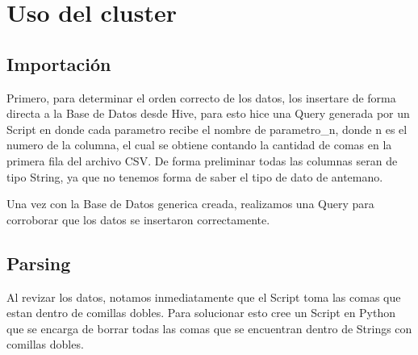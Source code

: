 \documentclass[9pt,letterpaper,twoside]{article}
\begin{document}
\begin{code}[H]
    
\end{code}

\newpage

\section{Uso del cluster}

\subsection{Importación}

\noindent
Primero, para determinar el orden correcto de los datos, los insertare de forma directa a la Base de Datos desde Hive, para esto hice una Query generada por un Script en donde
cada parametro recibe el nombre de parametro\_n, donde n es el numero de la columna, el cual se obtiene contando la cantidad de comas en la primera fila del archivo CSV. De 
forma preliminar todas las columnas seran de tipo String, ya que no tenemos forma de saber el tipo de dato de antemano.

\begin{code}[H]
    
\end{code}

\newpage

\begin{code}[H]
    
\end{code}

\noindent
Una vez con la Base de Datos generica creada, realizamos una Query para corroborar que los datos se insertaron correctamente.

\newpage

\subsection{Parsing}

\noindent
Al revizar los datos, notamos inmediatamente que el Script toma las comas que estan dentro de comillas dobles. Para solucionar esto cree un Script en Python que se encarga de borrar todas las
comas que se encuentran dentro de Strings con comillas dobles.
\end{document}
